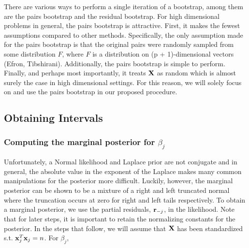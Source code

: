 There are various ways to perform a single iteration of a bootstrap, among them are the pairs bootstrap and the residual bootstrap. For high dimensional problems in general, the pairs bootstrap is attractive. First, it makes the fewest assumptions compared to other methods. Specifically, the only assumption made for the pairs bootstrap is that the original pairs were randomly sampled from some distribution $F$, where $F$ is a distribution on (p + 1)-dimensional vectors (Efron, Tibshirani). Additionally, the pairs bootstrap is simple to perform. Finally, and perhaps most importantly, it treats $\mathbf{X}$ as random which is almost surely the case in high dimensional settings. For this reason, we will solely focus on and use the pairs bootstrap in our proposed procedure.

\subsection{Obtaining Intervals}

\subsubsection{Computing the marginal posterior for \texorpdfstring{$\beta_j$}{betaj}}


Unfortunately, a Normal likelihood and Laplace prior are not conjugate and in general, the absolute value in the exponent of the Laplace makes many common manipulations for the posterior more difficult. Luckily, however, the marginal posterior can be shown to be a mixture of a right and left truncated normal where the truncation occurs at zero for right and left tails respectively. To obtain a marginal posterior, we use the partial residuals, $\mathbf{r}_{-j}$, in the likelihood. Note that for later steps, it is important to retain the normalizing constants for the posterior. In the steps that follow, we will assume that $\mathbf{X}$ has been standardized s.t. $\mathbf{x}_j^T\mathbf{x}_j = n$. For $\beta_j$,

